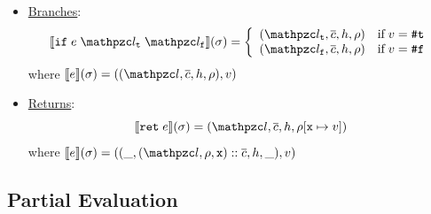 \begin{itemize}
  \item \underline{Branches}:
    \[
      \sem{\kwif \; \expr \; \lab_\vart \; \lab_\varf}(\st) =
      \left\{
        \begin{array}{ll}
          (\lab_\vart, \ctxts, \heap, \env) & \text{if} \; \val = \true\\
          (\lab_\varf, \ctxts, \heap, \env) & \text{if} \; \val = \false\\
        \end{array}
      \right.
    \]
    where $\sem{\expr}(\st) = ((\lab, \ctxts, \heap, \env), \val)$

  \item \underline{Returns}:
    \[
      \sem{\kwret \; \expr}(\st) = (\lab, \ctxts, \heap, \env[\varx \mapsto
      \val])
    \]
    where $\sem{\expr}(\st) = ((\_, (\lab, \env, \varx) :: \ctxts, \heap, \_),
    \val)$
\end{itemize}






\subsection{Partial Evaluation}

